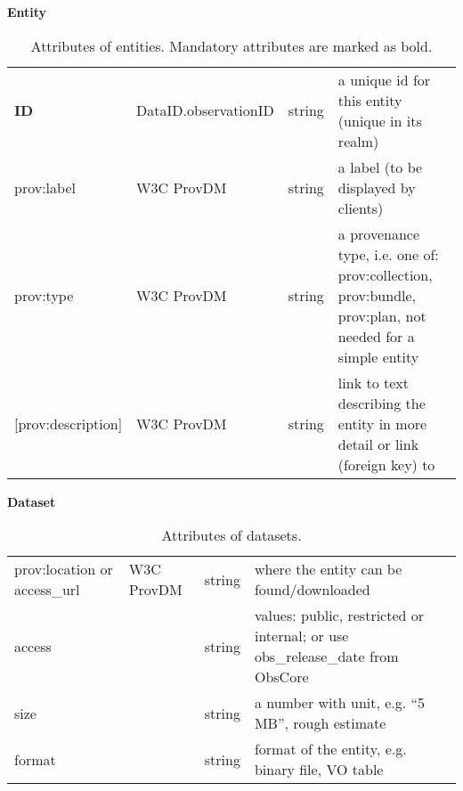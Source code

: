 \begin{table}[h]

\small
{}\textwidth

\textbf{\normalsize Entity}\vspace{0.25em}\\
\begin{tabulary}{1.0\textwidth}{@{}lp{3.5cm}lL@{}}
\toprule
{} &  &  & \\
\midrule
\textbf{ID} & DataID.observationID & string & a unique id for this entity (unique in its realm)\\
prov:label        & W3C ProvDM & string & a label (to be displayed by clients)\\
prov:type         & W3C ProvDM  & string & a provenance type, i.e. one of: prov:collection, prov:bundle, prov:plan, not needed for a simple entity\\
{[prov:description]}  & W3C ProvDM  & string & link to text describing the entity in more detail or link (foreign key) to \\
\bottomrule
\end{tabulary}
\caption{Attributes of entities. Mandatory attributes are marked as bold.
}\label{tab:entity-attributes}
\end{table}


\begin{table}[h]
\small
{}\textwidth
\textbf{\normalsize Dataset}\vspace{0.25em}\\
\begin{tabulary}{\textwidth}{@{}p{2.75cm}p{3cm}lL@{}}
\toprule
{} &  &  & \\
\midrule

prov:location or access\_url& W3C ProvDM  & string & where the entity can be found/downloaded\\
access           & & string & values: public, restricted or internal; or use obs\_release\_date from ObsCore\\
size             & & string & a number with unit, e.g. ``5 MB'', rough estimate\\
format           & & string & format of the entity, e.g. binary file, VO table\\
\bottomrule
\end{tabulary}
\caption{Attributes of datasets.
}\label{tab:dataset-attributes}
\end{table}


